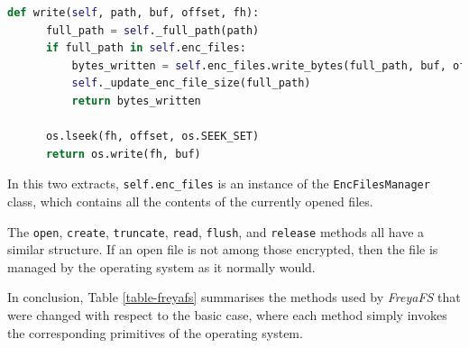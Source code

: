 \documentclass[a4paper,12pt,twoside,openright]{report}
\begin{document}
  \clearpage
  \begin{lstlisting}[language=Python]
  def write(self, path, buf, offset, fh):
      full_path = self._full_path(path)
      if full_path in self.enc_files:
          bytes_written = self.enc_files.write_bytes(full_path, buf, offset)
          self._update_enc_file_size(full_path)
          return bytes_written

      os.lseek(fh, offset, os.SEEK_SET)
      return os.write(fh, buf)
  \end{lstlisting}
  
  In this two extracts, \texttt{self.enc\_files} is an instance of the \texttt{EncFilesManager} class,
  which contains all the contents of the currently opened files.

  The \texttt{open}, \texttt{create}, \texttt{truncate}, \texttt{read}, \texttt{flush}, and \texttt{release} methods
  all have a similar structure. If an open file is not among those encrypted, then the file is managed by the operating
  system as it normally would.

  In conclusion, Table \ref{table-freyafs} summarises the methods used by \textit{FreyaFS} that were changed
  with respect to the basic case, where each method simply invokes the corresponding primitives of the operating system.
\end{document}
